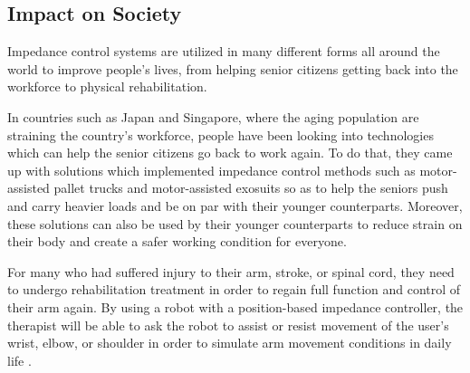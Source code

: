 \subsection*{Impact on Society} \par
Impedance control systems are utilized in many different forms all around the world to improve people's lives, from helping senior citizens getting back into the workforce to physical rehabilitation.\par
In countries such as Japan and Singapore, where the aging population are straining the country's workforce, people have been looking into technologies which can help the senior citizens go back to work again. To do that, they came up with solutions which implemented impedance control methods such as motor-assisted pallet trucks and motor-assisted exosuits so as to help the seniors push and carry heavier loads and be on par with their younger counterparts. Moreover, these solutions can also be used by their younger counterparts to reduce strain on their body and create a safer working condition for everyone.\par
For many who had suffered injury to their arm, stroke, or spinal cord, they need to undergo rehabilitation treatment in order to regain full function and control of their arm again. By using a robot with a position-based impedance controller, the therapist will be able to ask the robot to assist or resist movement of the user's wrist, elbow, or shoulder in order to simulate arm movement conditions in daily life \cite{IEEE2006}.